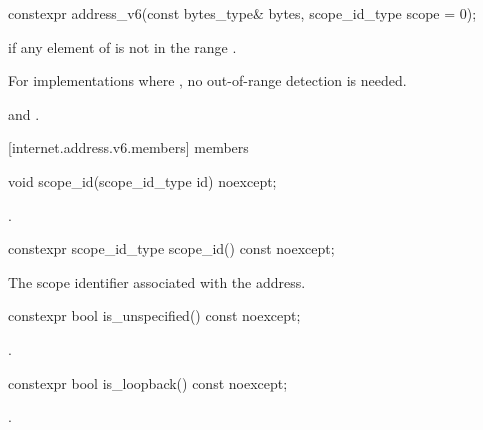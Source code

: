 \begin{itemdecl}
constexpr address_v6(const bytes_type& bytes,
                     scope_id_type scope = 0);
\end{itemdecl}

\begin{itemdescr}
\pnum
\remarks {} if any element of  is not in the range \tcode{[0, 0xFF]}. \begin{note} For implementations where , no out-of-range detection is needed. \end{note}

\pnum
\postconditions {} and .
\end{itemdescr}



[internet.address.v6.members]{ members}

%
\begin{itemdecl}
void scope_id(scope_id_type id) noexcept;
\end{itemdecl}

\begin{itemdescr}
\pnum
\postconditions {}.
\end{itemdescr}

\begin{itemdecl}
constexpr scope_id_type scope_id() const noexcept;
\end{itemdecl}

\begin{itemdescr}
\pnum
\returns The scope identifier associated with the address.
\end{itemdescr}

%
\begin{itemdecl}
constexpr bool is_unspecified() const noexcept;
\end{itemdecl}

\begin{itemdescr}
\pnum
\returns {}.
\end{itemdescr}

%
\begin{itemdecl}
constexpr bool is_loopback() const noexcept;
\end{itemdecl}

\begin{itemdescr}
\pnum
\returns {}.
\end{itemdescr}

